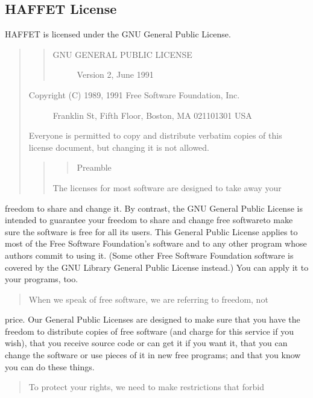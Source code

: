 \documentclass[letterpaper,10pt,english]{sphinxmanual}
\begin{document}
\subsection{HAFFET License}
\label{\detokenize{license:haffet-license}}
HAFFET is licensed under the GNU General Public License.
\begin{quote}
\begin{quote}
\begin{description}
\item[{GNU GENERAL PUBLIC LICENSE}] \leavevmode
Version 2, June 1991

\end{description}
\end{quote}
\begin{description}
\item[{Copyright (C) 1989, 1991 Free Software Foundation, Inc.}]  Franklin St, Fifth Floor, Boston, MA  02110\sphinxhyphen{}1301  USA

\end{description}

Everyone is permitted to copy and distribute verbatim copies
of this license document, but changing it is not allowed.
\begin{quote}
\begin{quote}

Preamble
\end{quote}

The licenses for most software are designed to take away your
\end{quote}
\end{quote}

freedom to share and change it.  By contrast, the GNU General Public
License is intended to guarantee your freedom to share and change free
software\textendash{}to make sure the software is free for all its users.  This
General Public License applies to most of the Free Software
Foundation’s software and to any other program whose authors commit to
using it.  (Some other Free Software Foundation software is covered by
the GNU Library General Public License instead.)  You can apply it to
your programs, too.
\begin{quote}

When we speak of free software, we are referring to freedom, not
\end{quote}

price.  Our General Public Licenses are designed to make sure that you
have the freedom to distribute copies of free software (and charge for
this service if you wish), that you receive source code or can get it
if you want it, that you can change the software or use pieces of it
in new free programs; and that you know you can do these things.
\begin{quote}

To protect your rights, we need to make restrictions that forbid
\end{quote}
\end{document}
